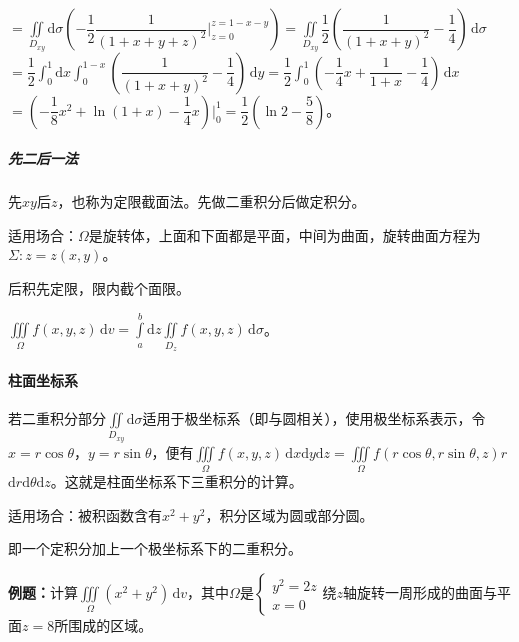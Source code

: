 \documentclass[UTF8, 12pt]{ctexart}
\begin{document}
$=\displaystyle{\iint\limits_{D_{xy}}\textrm{d}\sigma\left(-\dfrac{1}{2}\dfrac{1}{(1+x+y+z)^2}\bigg|_{z=0}^{z=1-x-y}\right)}=\displaystyle{\iint\limits_{D_{xy}}\dfrac{1}{2}\left(\dfrac{1}{(1+x+y)^2}-\dfrac{1}{4}\right)\,\textrm{d}\sigma}$\\$=\dfrac{1}{2}\int_0^1\textrm{d}x\int_0^{1-x}\left(\dfrac{1}{(1+x+y)^2}-\dfrac{1}{4}\right)\,\textrm{d}y=\dfrac{1}{2}\displaystyle{\int_0^1\left(-\dfrac{1}{4}x+\dfrac{1}{1+x}-\dfrac{1}{4}\right)\,\textrm{d}x}$\\$=\left(-\dfrac{1}{8}x^2+\ln(1+x)-\dfrac{1}{4}x\right)\bigg|_0^1=\dfrac{1}{2}\left(\ln2-\dfrac{5}{8}\right)$。

\subparagraph{先二后一法} \leavevmode \medskip

先$xy$后$z$，也称为定限截面法。先做二重积分后做定积分。

适用场合：$\Omega$是旋转体，上面和下面都是平面，中间为曲面，旋转曲面方程为$\Sigma:z=z(x,y)$。

后积先定限，限内截个面限。

$\iiint\limits_\Omega f(x,y,z)\,\textrm{d}v=\int\limits_a^b\textrm{d}z\iint\limits_{D_z}f(x,y,z)\,\textrm{d}\sigma$。

\paragraph{柱面坐标系} \leavevmode \medskip

若二重积分部分$\iint\limits_{D_{xy}}\textrm{d}\sigma$适用于极坐标系（即与圆相关），使用极坐标系表示，令$x=r\cos\theta$，$y=r\sin\theta$，便有$\iiint\limits_\Omega f(x,y,z)\,\textrm{d}x\textrm{d}y\textrm{d}z=\iiint\limits_\Omega f(r\cos\theta,r\sin\theta,z)r\,$\\$\textrm{d}r\textrm{d}\theta\textrm{d}z$。这就是柱面坐标系下三重积分的计算。

适用场合：被积函数含有$x^2+y^2$，积分区域为圆或部分圆。

即一个定积分加上一个极坐标系下的二重积分。


\textbf{例题：}计算$\iiint\limits_\Omega(x^2+y^2)\,\textrm{d}v$，其中$\Omega$是$\left\{\begin{array}{ll}
    y^2=2z \\
    x=0
\end{array}\right.$绕$z$轴旋转一周形成的曲面与平面$z=8$所围成的区域。
\end{document}
